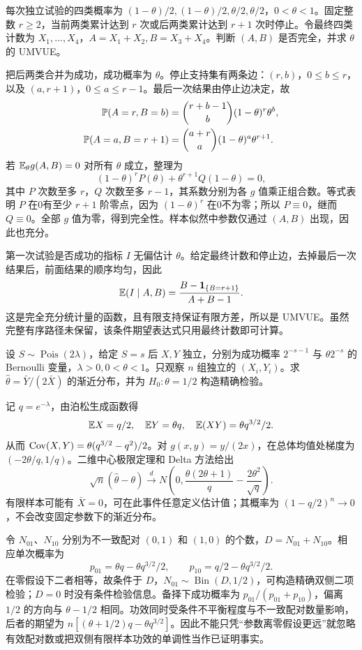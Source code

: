 \begin{example}[原题5：双边停止抽样下的完全性与无偏估计]\label{yau:2023-5}
每次独立试验的四类概率为 $(1-\theta)/2,(1-\theta)/2,\theta/2,\theta/2$，$0<\theta<1$。固定整数 $r\ge2$，当前两类累计达到 $r$ 次或后两类累计达到 $r+1$ 次时停止。令最终四类计数为 $X_1,\ldots,X_4$，$A=X_1+X_2,B=X_3+X_4$。判断 $(A,B)$ 是否完全，并求 $\theta$ 的 UMVUE。
\end{example}
\begin{solve}
把后两类合并为成功，成功概率为 $\theta$。停止支持集有两条边：$(r,b)$，$0\le b\le r$，以及 $(a,r+1)$，$0\le a\le r-1$。最后一次结果由停止边决定，故
\[
\begin{aligned}
\mathbb P(A=r,B=b)&=\binom{r+b-1}{b}(1-\theta)^r\theta^b,\\
\mathbb P(A=a,B=r+1)&=\binom{a+r}{a}(1-\theta)^a\theta^{r+1}.
\end{aligned}
\]
若 $\mathbb E_\theta g(A,B)=0$ 对所有 $\theta$ 成立，整理为
\[
(1-\theta)^rP(\theta)+\theta^{r+1}Q(1-\theta)=0,
\]
其中 $P$ 次数至多 $r$，$Q$ 次数至多 $r-1$，其系数分别为各 $g$ 值乘正组合数。等式表明 $P$ 在0有至少 $r+1$ 阶零点，因为 $(1-\theta)^r$ 在0不为零；所以 $P\equiv0$，继而 $Q\equiv0$。全部 $g$ 值为零，得到完全性。样本似然中参数仅通过 $(A,B)$ 出现，因此也充分。

第一次试验是否成功的指标 $I$ 无偏估计 $\theta$。给定最终计数和停止边，去掉最后一次结果后，前面结果的顺序均匀，因此
\[
\mathbb E(I\mid A,B)=\frac{B-\mathbf1_{\{B=r+1\}}}{A+B-1}.
\]
这是完全充分统计量的函数，且有限支持保证有限方差，所以是 UMVUE。虽然完整有序路径未保留，该条件期望表达式只用最终计数即可计算。
\end{solve}

\begin{example}[原题6：潜在泊松混合中的比率估计与精确检验]\label{yau:2023-6}
设 $S\sim\operatorname{Pois}(2\lambda)$，给定 $S=s$ 后 $X,Y$ 独立，分别为成功概率 $2^{-s-1}$ 与 $\theta2^{-s}$ 的 Bernoulli 变量，$\lambda>0,0<\theta<1$。只观察 $n$ 组独立的 $(X_i,Y_i)$。求 $\widehat\theta=\bar Y/(2\bar X)$ 的渐近分布，并为 $H_0:\theta=1/2$ 构造精确检验。
\end{example}
\begin{solve}
记 $q=e^{-\lambda}$，由泊松生成函数得
\[
\mathbb E X=q/2,\quad\mathbb E Y=\theta q,\quad\mathbb E(XY)=\theta q^{3/2}/2.
\]
从而 $\operatorname{Cov}(X,Y)=\theta(q^{3/2}-q^2)/2$。对 $g(x,y)=y/(2x)$，在总体均值处梯度为 $(-2\theta/q,1/q)$。二维中心极限定理和 Delta 方法给出
\[
\sqrt n(\widehat\theta-\theta)\xrightarrow d
N\left(0,\frac{\theta(2\theta+1)}q-\frac{2\theta^2}{\sqrt q}\right).
\]
有限样本可能有 $\bar X=0$，可在此事件任意定义估计值；其概率为 $(1-q/2)^n\to0$，不会改变固定参数下的渐近分布。

令 $N_{01}$、$N_{10}$ 分别为不一致配对 $(0,1)$ 和 $(1,0)$ 的个数，$D=N_{01}+N_{10}$。相应单次概率为
\[
p_{01}=\theta q-\theta q^{3/2}/2,\qquad p_{10}=q/2-\theta q^{3/2}/2.
\]
在零假设下二者相等，故条件于 $D$，$N_{01}\sim\operatorname{Bin}(D,1/2)$，可构造精确双侧二项检验；$D=0$ 时没有条件检验信息。备择下成功概率为 $p_{01}/(p_{01}+p_{10})$，偏离 $1/2$ 的方向与 $\theta-1/2$ 相同。功效同时受条件不平衡程度与不一致配对数量影响，后者的期望为 $n[(\theta+1/2)q-\theta q^{3/2}]$。因此不能只凭“参数离零假设更远”就忽略有效配对数或把双侧有限样本功效的单调性当作已证明事实。
\end{solve}

